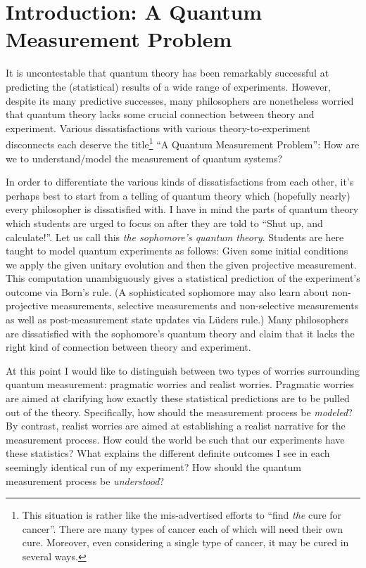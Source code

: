 \documentclass[prd,twocolumn,superscriptaddress,floatfix,amsmath,amssymb,amsfonts,nofootinbib]{revtex4-2}
\begin{document}
\maketitle
\section{Introduction: A Quantum Measurement Problem}\label{Introduction}
It is uncontestable that quantum theory has been remarkably successful at predicting the (statistical) results of a wide range of experiments. However, despite its many predictive successes, many philosophers are nonetheless worried that quantum theory lacks some crucial connection between theory and experiment. Various dissatisfactions with various theory-to-experiment disconnects each deserve the title\footnote{This situation is rather like the mis-advertised efforts to ``find \textit{the} cure for cancer''. There are many types of cancer each of which will need their own cure. Moreover, even considering a single type of cancer, it may be cured in several ways.} ``A Quantum Measurement Problem'': How are we to understand/model the measurement of quantum systems?
    
In order to differentiate the various kinds of dissatisfactions from each other, it's perhaps best to start from a telling of quantum theory which (hopefully nearly) every philosopher is dissatisfied with. I have in mind the parts of quantum theory which students are urged to focus on after they are told to ``Shut up, and calculate!''. Let us call this \textit{the sophomore's quantum theory}. Students are here taught to model quantum experiments as follows: Given some initial conditions we apply the given unitary evolution and then the given projective measurement. This computation unambiguously gives a statistical prediction of the experiment's outcome via Born's rule. (A sophisticated sophomore may also learn about non-projective measurements, selective measurements and non-selective measurements as well as post-measurement state updates via L\"uders rule.) Many philosophers are dissatisfied with the sophomore's quantum theory and claim that it lacks the right kind of connection between theory and experiment.

At this point I would like to distinguish between two types of worries surrounding quantum measurement: pragmatic worries and realist worries. Pragmatic worries are aimed at clarifying how exactly these statistical predictions are to be pulled out of the theory. Specifically, how should the measurement process be \textit{modeled}? By contrast, realist worries are aimed at establishing a realist narrative for the measurement process. How could the world be such that our experiments have these statistics? What explains the different definite outcomes I see in each seemingly identical run of my experiment? How should the quantum measurement process be \textit{understood}?
\end{document}
